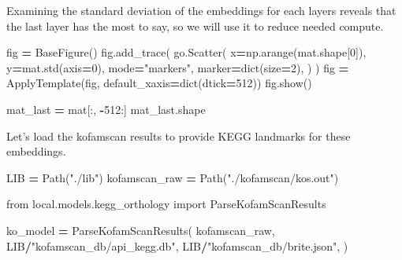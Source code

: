 \documentclass[
]{book}
\newenvironment{Shaded}{\begin{snugshade}}{\end{snugshade}}
\newcommand{\BuiltInTok}[1]{#1}
\newcommand{\DecValTok}[1]{\textcolor[rgb]{0.00,0.00,0.81}{#1}}
\newcommand{\ImportTok}[1]{#1}
\newcommand{\NormalTok}[1]{#1}
\newcommand{\OperatorTok}[1]{\textcolor[rgb]{0.81,0.36,0.00}{\textbf{#1}}}
\newcommand{\StringTok}[1]{\textcolor[rgb]{0.31,0.60,0.02}{#1}}
\begin{document}
Examining the standard deviation of the embeddings for each layers reveals that the last layer has the most to say,
so we will use it to reduce needed compute.

\begin{Shaded}
\begin{Highlighting}[numbers=left,,]
\NormalTok{fig }\OperatorTok{=}\NormalTok{ BaseFigure()}
\NormalTok{fig.add\_trace(}
\NormalTok{    go.Scatter(}
\NormalTok{        x}\OperatorTok{=}\NormalTok{np.arange(mat.shape[}\DecValTok{0}\NormalTok{]),}
\NormalTok{        y}\OperatorTok{=}\NormalTok{mat.std(axis}\OperatorTok{=}\DecValTok{0}\NormalTok{),}
\NormalTok{        mode}\OperatorTok{=}\StringTok{"markers"}\NormalTok{,}
\NormalTok{        marker}\OperatorTok{=}\BuiltInTok{dict}\NormalTok{(size}\OperatorTok{=}\DecValTok{2}\NormalTok{),}
\NormalTok{    )}
\NormalTok{)}
\NormalTok{fig }\OperatorTok{=}\NormalTok{ ApplyTemplate(fig, default\_xaxis}\OperatorTok{=}\BuiltInTok{dict}\NormalTok{(dtick}\OperatorTok{=}\DecValTok{512}\NormalTok{))}
\NormalTok{fig.show()}
\end{Highlighting}
\end{Shaded}

\begin{Shaded}
\begin{Highlighting}[numbers=left,,]
\NormalTok{mat\_last }\OperatorTok{=}\NormalTok{ mat[:, }\OperatorTok{{-}}\DecValTok{512}\NormalTok{:]}
\NormalTok{mat\_last.shape}
\end{Highlighting}
\end{Shaded}

Let's load the kofamscan results to provide KEGG landmarks for these embeddings.

\begin{Shaded}
\begin{Highlighting}[numbers=left,,]
\NormalTok{LIB }\OperatorTok{=}\NormalTok{ Path(}\StringTok{"./lib"}\NormalTok{)}
\NormalTok{kofamscan\_raw }\OperatorTok{=}\NormalTok{ Path(}\StringTok{"./kofamscan/kos.out"}\NormalTok{)}
\end{Highlighting}
\end{Shaded}

\begin{Shaded}
\begin{Highlighting}[numbers=left,,]
\ImportTok{from}\NormalTok{ local.models.kegg\_orthology }\ImportTok{import}\NormalTok{ ParseKofamScanResults}

\NormalTok{ko\_model }\OperatorTok{=}\NormalTok{ ParseKofamScanResults(}
\NormalTok{    kofamscan\_raw,}
\NormalTok{    LIB}\OperatorTok{/}\StringTok{"kofamscan\_db/api\_kegg.db"}\NormalTok{,}
\NormalTok{    LIB}\OperatorTok{/}\StringTok{"kofamscan\_db/brite.json"}\NormalTok{,}
\NormalTok{)}
\end{Highlighting}
\end{Shaded}
\end{document}
